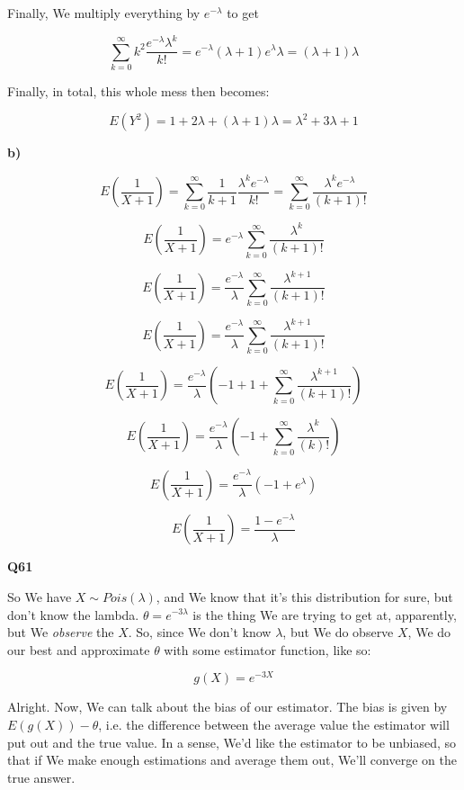 \documentclass{article}
\begin{document}
		Finally, We multiply everything by $e^{-\lambda}$ to get
		
		\[ \sum^\infty_{k=0} k^2\frac{e^{-\lambda}\lambda^k}{k!} = e^{-\lambda}(\lambda+1)e^\lambda\lambda = (\lambda + 1)\lambda \]
		
		Finally, in total, this whole mess then becomes:
		
		\[ E(Y^2) = 1 + 2\lambda +  (\lambda + 1)\lambda = \lambda^2 + 3\lambda + 1 \]
		
		\textbf{b)}
		
		\[ E\left( \frac{1}{X+1} \right) = \sum^\infty_{k=0} \frac{1}{k+1}\frac{\lambda^ke^{-\lambda}}{k!} = \sum^\infty_{k=0} \frac{\lambda^ke^{-\lambda}}{(k+1)!} \]
		
		\[ E\left( \frac{1}{X+1} \right) = e^{-\lambda}\sum^\infty_{k=0} \frac{\lambda^k}{(k+1)!} \]	
		
		\[ E\left( \frac{1}{X+1} \right) = \frac{e^{-\lambda}}{\lambda} \sum^\infty_{k=0} \frac{\lambda^{k+1}}{(k+1)!} \]	
		
		\[ E\left( \frac{1}{X+1} \right) = \frac{e^{-\lambda}}{\lambda} \sum^\infty_{k=0} \frac{\lambda^{k+1}}{(k+1)!} \]	
		
		\[ E\left( \frac{1}{X+1} \right) = \frac{e^{-\lambda}}{\lambda} \left(-1 + 1 + \sum^\infty_{k=0} \frac{\lambda^{k+1}}{(k+1)!} \right) \]	
		
		\[ E\left( \frac{1}{X+1} \right) = \frac{e^{-\lambda}}{\lambda} \left(-1 + \sum^\infty_{k=0} \frac{\lambda^{k}}{(k)!} \right) \]	
		
		\[ E\left( \frac{1}{X+1} \right) = \frac{e^{-\lambda}}{\lambda} \left(-1 + e^\lambda\right) \]	
		
		\[ E\left( \frac{1}{X+1} \right) = \frac{1-e^{-\lambda}}{\lambda}  \]	
		
		 \hfill
		 
		 \textbf{Q61}
		 
		 So We have $X\sim Pois(\lambda)$, and We know that it's this distribution for sure, but don't know the lambda. $\theta = e^{-3\lambda}$ is the thing We are trying to get at, apparently, but We \textit{observe} the $X$. So, since We don't know $\lambda$, but We do observe $X$, We do our best and approximate $\theta$ with some estimator function, like so:
		 
		 \[ g(X) = e^{-3X} \]
		 
		 Alright. Now, We can talk about the bias of our estimator. The bias is given by $E(g(X)) - \theta$, i.e. the difference between the average value the estimator will put out and the true value. In a sense, We'd like the estimator to be unbiased, so that if We make enough estimations and average them out, We'll converge on the true answer. 
		 
\end{document}
